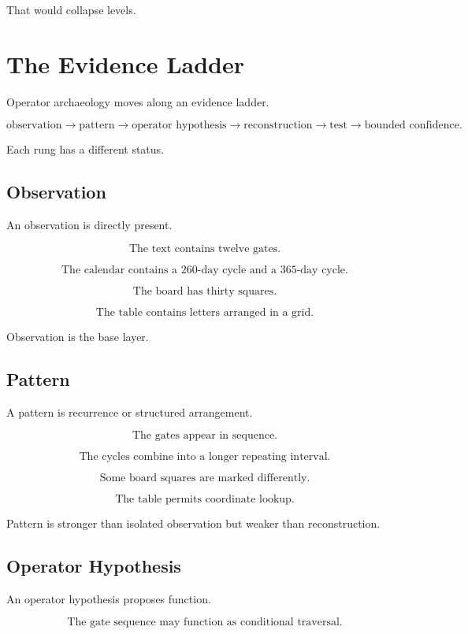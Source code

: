\documentclass[11pt]{book}
\begin{document}
That would collapse levels.

\section{The Evidence Ladder}

Operator archaeology moves along an evidence ladder.

\[
\text{observation}
\rightarrow
\text{pattern}
\rightarrow
\text{operator hypothesis}
\rightarrow
\text{reconstruction}
\rightarrow
\text{test}
\rightarrow
\text{bounded confidence}.
\]

Each rung has a different status.

\subsection{Observation}

An observation is directly present.

\[
\text{The text contains twelve gates.}
\]

\[
\text{The calendar contains a 260-day cycle and a 365-day cycle.}
\]

\[
\text{The board has thirty squares.}
\]

\[
\text{The table contains letters arranged in a grid.}
\]

Observation is the base layer.

\subsection{Pattern}

A pattern is recurrence or structured arrangement.

\[
\text{The gates appear in sequence.}
\]

\[
\text{The cycles combine into a longer repeating interval.}
\]

\[
\text{Some board squares are marked differently.}
\]

\[
\text{The table permits coordinate lookup.}
\]

Pattern is stronger than isolated observation but weaker than reconstruction.

\subsection{Operator Hypothesis}

An operator hypothesis proposes function.

\[
\text{The gate sequence may function as conditional traversal.}
\]
\end{document}
